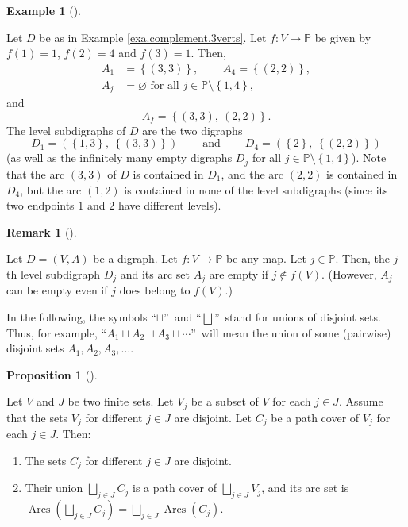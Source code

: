\documentclass[numbers=enddot,12pt,final,onecolumn,notitlepage]{scrartcl}%
\numberwithin{exer}{section}
\theoremstyle{definition}
\newtheorem{prop}[theo]{Proposition}
\newenvironment{proposition}[1][]
{\begin{prop}[#1]\begin{leftbar}}
{\end{leftbar}\end{prop}}
\newtheorem{remk}[theo]{Remark}
\newenvironment{remark}[1][]
{\begin{remk}[#1]\begin{leftbar}}
{\end{leftbar}\end{remk}}
\newtheorem{exam}[theo]{Example}
\newenvironment{example}[1][]
{\begin{exam}[#1]\begin{leftbar}}
{\end{leftbar}\end{exam}}
\let\sqcupnonlimits\bigsqcup
\renewcommand{\bigsqcup}{\sqcupnonlimits\limits}
\begin{document}
\begin{example}
Let $D$ be as in Example \ref{exa.complement.3verts}. Let $f:V\rightarrow
\mathbb{P}$ be given by $f\left(  1\right)  =1$, $f\left(  2\right)  =4$ and
$f\left(  3\right)  =1$. Then,
\begin{align*}
A_{1}  &  =\left\{  \left(  3,3\right)  \right\}  ,\ \ \ \ \ \ \ \ \ \ A_{4}%
=\left\{  \left(  2,2\right)  \right\}  ,\\
A_{j}  &  =\varnothing\text{ for all }j\in\mathbb{P}\setminus\left\{
1,4\right\}  ,
\end{align*}
and%
\[
A_{f}=\left\{  \left(  3,3\right)  ,\ \left(  2,2\right)  \right\}  .
\]
The level subdigraphs of $D$ are the two digraphs%
\[
D_{1}=\left(  \left\{  1,3\right\}  ,\ \left\{  \left(  3,3\right)  \right\}
\right)  \ \ \ \ \ \ \ \ \ \ \text{and}\ \ \ \ \ \ \ \ \ \ D_{4}=\left(
\left\{  2\right\}  ,\ \left\{  \left(  2,2\right)  \right\}  \right)
\]
(as well as the infinitely many empty digraphs $D_{j}$ for all $j\in
\mathbb{P}\setminus\left\{  1,4\right\}  $). Note that the arc $\left(
3,3\right)  $ of $D$ is contained in $D_{1}$, and the arc $\left(  2,2\right)
$ is contained in $D_{4}$, but the arc $\left(  1,2\right)  $ is contained in
none of the level subdigraphs (since its two endpoints $1$ and $2$ have
different levels).
\end{example}

\begin{remark}
Let $D=\left(  V,A\right)  $ be a digraph. Let $f:V\rightarrow\mathbb{P}$ be
any map. Let $j\in\mathbb{P}$. Then, the $j$-th level subdigraph $D_{j}$ and
its arc set $A_{j}$ are empty if $j\notin f\left(  V\right)  $. (However,
$A_{j}$ can be empty even if $j$ does belong to $f\left(  V\right)  $.)
\end{remark}

In the following, the symbols \textquotedblleft$\sqcup$\textquotedblright\ and
\textquotedblleft$\bigsqcup$\textquotedblright\ stand for unions of disjoint
sets. Thus, for example, \textquotedblleft$A_{1}\sqcup A_{2}\sqcup A_{3}%
\sqcup\cdots$\textquotedblright\ will mean the union of some (pairwise)
disjoint sets $A_{1},A_{2},A_{3},\ldots$.

\begin{proposition}
\label{prop.path-covers-djun}Let $V$ and $J$ be two finite sets. Let $V_{j}$
be a subset of $V$ for each $j\in J$. Assume that the sets $V_{j}$ for
different $j\in J$ are disjoint. Let $C_{j}$ be a path cover of $V_{j}$ for
each $j\in J$. Then:

\begin{enumerate}
\item[\textbf{(a)}] The sets $C_{j}$ for different $j\in J$ are disjoint.

\item[\textbf{(b)}] Their union $\bigsqcup_{j\in J}C_{j}$ is a path cover of
$\bigsqcup_{j\in J}V_{j}$, and its arc set is $\operatorname*{Arcs}\left(
\bigsqcup_{j\in J}C_{j}\right)  =\bigsqcup_{j\in J}\operatorname*{Arcs}\left(
C_{j}\right)  $.
\end{enumerate}
\end{proposition}
\end{document}

